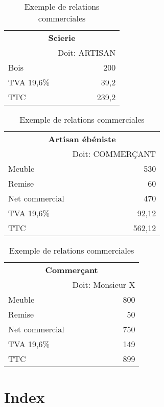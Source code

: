 \documentclass[11pt]{article}
\begin{document}
            \begin{table}[H]
                \begin{center}
                    \begin{tabular}{|lr|}
                        \hline
                        \multicolumn{2}{|c|}{\textbf{Scierie}}\\
                         & Doit: ARTISAN\\
                        \hline
                        Bois & 200\\
                        TVA 19,6\% & 39,2\\
                        \cline{2-2}TTC & 239,2\\
                        \hline
                    \end{tabular}
                    \begin{tabular}{|lr|}
                        \hline
                        \multicolumn{2}{|c|}{\textbf{Artisan ébéniste}}\\
                         & Doit: COMMERÇANT\\
                        \hline
                        Meuble & 530\\
                        Remise & 60\\
                        \cline{2-2}Net commercial & 470\\
                        TVA 19,6\% & 92,12\\
                        \cline{2-2}TTC & 562,12\\
                        \hline
                    \end{tabular}

                    \begin{tabular}{|lr|}
                        \hline
                        \multicolumn{2}{|c|}{\textbf{Commerçant}}\\
                         & Doit: Monsieur X\\
                        \hline
                        Meuble & 800\\
                        Remise & 50\\
                        \cline{2-2}Net commercial & 750\\
                        TVA 19,6\% & 149\\
                        \cline{2-2}TTC & 899\\
                        \hline
                    \end{tabular}
                \end{center}
                \caption{Exemple de relations commerciales}
            \end{table}
		
\appendix
\newpage
\part*{Index}
\tableofcontents
\newpage
\listoftables
\listoffigures
\end{document}
